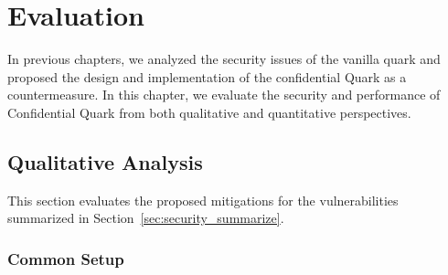 \chapter{Evaluation}
\label{sec:evaluation}

In previous chapters, we analyzed the security issues of the vanilla quark and proposed the design and implementation of the confidential Quark as a countermeasure. In this chapter, we evaluate the security and performance of Confidential Quark from both 
qualitative and quantitative perspectives.

\section{Qualitative Analysis}
This section evaluates the proposed mitigations for the vulnerabilities summarized in Section~\ref{sec:security_summarize}.

\subsection{Common Setup}



